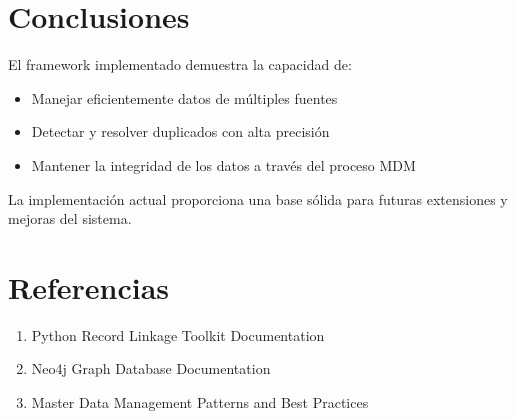 \documentclass[12pt]{article}
\begin{document}
\section{Conclusiones}
El framework implementado demuestra la capacidad de:

\begin{itemize}
    \item Manejar eficientemente datos de múltiples fuentes
    \item Detectar y resolver duplicados con alta precisión
    \item Mantener la integridad de los datos a través del proceso MDM
\end{itemize}

La implementación actual proporciona una base sólida para futuras extensiones 
y mejoras del sistema.

\section{Referencias}
\begin{enumerate}
    \item Python Record Linkage Toolkit Documentation
    \item Neo4j Graph Database Documentation
    \item Master Data Management Patterns and Best Practices
\end{enumerate}
\end{document}
